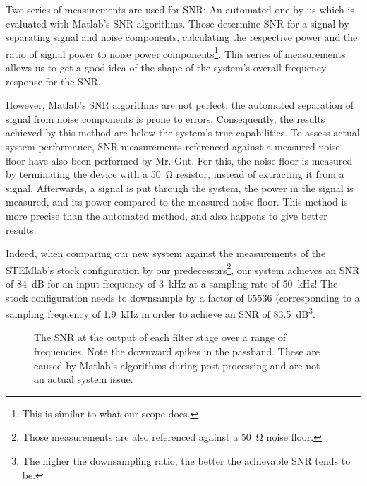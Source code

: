 Two series of measurements  are used for SNR: An automated one  by us which is
evaluated with  Matlab's SNR algorithms. Those  determine SNR for a  signal by
separating signal and  noise components, calculating the  respective power and
the ratio of signal power to noise power components\footnote{%
    This is similar to what our scope does.%
}.
This series of measurements  allows us to get a good idea of  the shape of the
system's overall frequency response for the SNR.

However, Matlab's SNR algorithms are  not perfect; the automated separation of
signal from  noise components  is prone  to errors. Consequently,  the results
achieved by  this method are  below the system's true  capabilities. To assess
actual  system performance,  SNR  measurements referenced  against a  measured
noise floor have also been performed  by Mr. Gut. For this, the noise floor is
measured by terminating  the device with a \SI{50}{\ohm}  resistor, instead of
extracting it from  a signal. Afterwards, a signal is put  through the system,
the power in  the signal is measured,  and its power compared  to the measured
noise floor. This method  is more precise than the automated  method, and also
happens to give better results.

Indeed,  when  comparing  our  new  system against  the  measurements  of  the
STEMlab's stock configuration by our predecessors\footnote{%
    Those  measurements  are also  referenced  against  a \SI{50}{\ohm}  noise
    floor.%
}, our system achieves an SNR of \SI{84}{\dB} for an input frequency of \SI{3}{\kHz}
at a sampling rate of \SI{50}{\kHz}! The stock configuration needs to downsample
by a factor of \num{65536} (corresponding to a sampling frequency of \SI{1.9}{\kHz}
in order to achieve an SNR of \SI{83.5}{\dB}\footnote{%
    The higher the downsampling ratio, the  better the achievable SNR tends to
    be.%
}.

\begin{figure}
    \centering
    
    \caption[SNR at Filter Outputs]{%
        The  SNR  at  the  output  of  each  filter  stage  over  a  range  of
        frequencies.   Note the  downward  spikes in  the passband. These  are
        caused by  Matlab's algorithms during  post-processing and are  not an
        actual system issue.%
    }
    \label{fig:verification:snrAll}
\end{figure}

